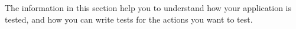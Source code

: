 The information in this section help you to understand how your  application is tested, and how you can write tests for the actions you want to test. 
